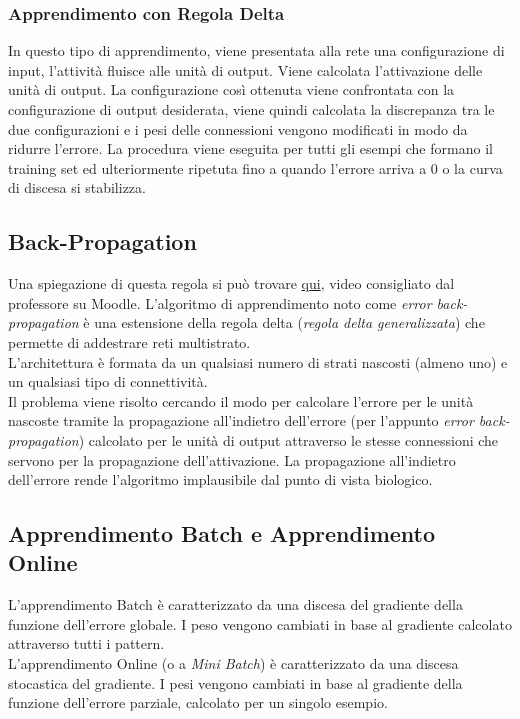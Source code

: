 \documentclass[12pt, a4paper]{article}
\begin{document}
\subsubsection{Apprendimento con Regola Delta}
In questo tipo di apprendimento, viene presentata alla rete una configurazione di input, l'attività fluisce alle unità di output. Viene calcolata l'attivazione delle unità di output. La configurazione così ottenuta viene confrontata con la configurazione di output desiderata, viene quindi calcolata la discrepanza tra le due configurazioni e i pesi delle connessioni vengono modificati in modo da ridurre l'errore. La procedura viene eseguita per tutti gli esempi che formano il training set ed ulteriormente ripetuta fino a quando l'errore arriva a 0 o la curva di discesa si stabilizza.

\subsection{Back-Propagation}
Una spiegazione di questa regola si può trovare \href{https://www.youtube.com/watch?v=Ilg3gGewQ5U}{qui}, video consigliato dal professore su Moodle.
L'algoritmo di apprendimento noto come \textit{error back-propagation} è una estensione della regola delta (\textit{regola delta generalizzata}) che permette di addestrare reti multistrato.\\
L'architettura è formata da un qualsiasi numero di strati nascosti (almeno uno) e un qualsiasi tipo di connettività.\\
Il problema viene risolto cercando il modo per calcolare l'errore per le unità nascoste tramite la propagazione all'indietro dell'errore (per l'appunto \textit{error back-propagation}) calcolato per le unità di output attraverso le stesse connessioni che servono per la propagazione dell'attivazione. La propagazione all'indietro dell'errore rende l'algoritmo implausibile dal punto di vista biologico.

\subsection{Apprendimento Batch e Apprendimento Online}
L'apprendimento Batch è caratterizzato da una discesa del gradiente della funzione dell'errore globale. I peso vengono cambiati in base al gradiente calcolato attraverso tutti i pattern.\\
L'apprendimento Online (o a \textit{Mini Batch}) è caratterizzato da una discesa stocastica del gradiente. I pesi vengono cambiati in base al gradiente della funzione dell'errore parziale, calcolato per un singolo esempio.
\end{document}
